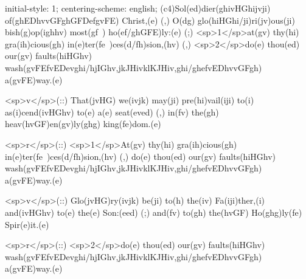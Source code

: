 initial-style: 1;
centering-scheme: english;
(c4)Sol(ed)dier(ghivHGhijvji) of(ghEDhvvGFghGFDefgvFE) Christ,(e) (,) O(dg) glo(hiHGhi/ji)ri(jv)ous(ji) bish(g)op(ighhv) most(gf~) ho(ef/ghGFE)ly:(e) (;) <sp>1</sp>at(gv) thy(hi) gra(ih)cious(gh) in(e)ter(fe~)ces(d/fh)sion,(hv) (,) <sp>2</sp>do(e) thou(ed) our(gv) faults(hiHGhv) wash(gvFEfvEDevghi/hjIGhv,jkJHivklKJHiv,ghi/ghefvEDhvvGFgh) a(gvFE)way.(e)

<sp>v</sp>(::) That(jvHG) we(ivjk) may(ji) pre(hi)vail(iji) to(i) as(i)cend(ivHGhv) to(e) a(e) seat(eved) (,) in(fv) the(gh) heav(hvGF)en(gv)ly(ghg) king(fe)dom.(e)

<sp>r</sp>(::) <sp>1</sp>At(gv) thy(hi) gra(ih)cious(gh) in(e)ter(fe~)ces(d/fh)sion,(hv) (,) do(e) thou(ed) our(gv) faults(hiHGhv) wash(gvFEfvEDevghi/hjIGhv,jkJHivklKJHiv,ghi/ghefvEDhvvGFgh) a(gvFE)way.(e)

<sp>v</sp>(::) Glo(jvHG)ry(ivjk) be(ji) to(h) the(iv) Fa(iji)ther,(i) and(ivHGhv) to(e) the(e) Son:(eed) (;) and(fv) to(gh) the(hvGF) Ho(ghg)ly(fe) Spir(e)it.(e)

<sp>r</sp>(::) <sp>2</sp>do(e) thou(ed) our(gv) faults(hiHGhv) wash(gvFEfvEDevghi/hjIGhv,jkJHivklKJHiv,ghi/ghefvEDhvvGFgh) a(gvFE)way.(e)